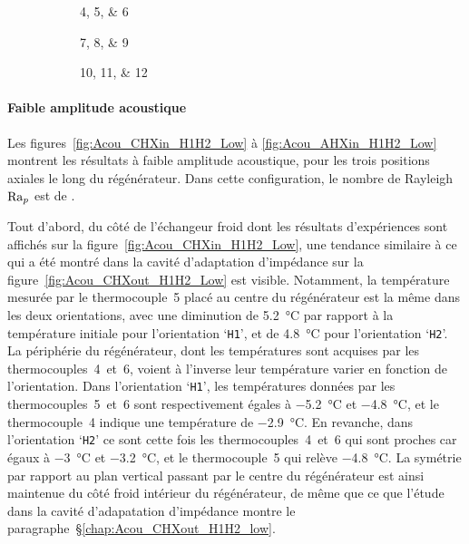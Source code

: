 \begin{figure}[!ht]
    \centering
	\begin{subfigure}{\textwidth}
		\centering
		
		\caption{\numlist{4;5;6}}
		\label{fig:HeatOnly_CHXin_H1H2}
	\end{subfigure}	
	\begin{subfigure}{\textwidth}
		\centering
		
		\caption{\numlist{7;8;9}}
		\label{fig:HeatOnly_Regmid_H1H2}
	\end{subfigure}	
	\begin{subfigure}{\textwidth}
		\centering
		
		\caption{\numlist{10;11;12}}
		\label{fig:HeatOnly_AHXin_H1H2}
	\end{subfigure}		   
    \caption{}
    \label{fig:HeatOnly_H1H2}
\end{figure}


\paragraph*{Faible amplitude acoustique}
Les figures~\ref{fig:Acou_CHXin_H1H2_Low} à \ref{fig:Acou_AHXin_H1H2_Low} montrent les résultats à faible amplitude acoustique, pour les trois positions axiales le long du régénérateur. Dans cette configuration, le nombre de Rayleigh $\mathrm{Ra}_p$ est de . 

Tout d'abord, du côté de l'échangeur froid dont les résultats d'expériences sont affichés sur la figure~\ref{fig:Acou_CHXin_H1H2_Low}, une tendance similaire à ce qui a été montré dans la cavité d'adaptation d'impédance sur la figure~\ref{fig:Acou_CHXout_H1H2_Low} est visible. Notamment, la température mesurée par le thermocouple~5 placé au centre du régénérateur est la même dans les deux orientations, avec une diminution de \qty{5.2}{\degreeCelsius} par rapport à la température initiale pour l'orientation `\texttt{H1}', et de \qty{4.8}{\degreeCelsius} pour l'orientation `\texttt{H2}'. La périphérie du régénérateur, dont les températures sont acquises par les thermocouples~4~et~6, voient à l'inverse leur température varier en fonction de l'orientation. Dans l'orientation `\texttt{H1}', les températures données par les thermocouples~5~et~6 sont respectivement égales à \qty{-5.2}{\degreeCelsius} et \qty{-4.8}{\degreeCelsius}, et le thermocouple~4 indique une température de \qty{-2.9}{\degreeCelsius}. En revanche, dans l'orientation `\texttt{H2}' ce sont cette fois les thermocouples~4~et~6 qui sont proches car égaux à \qty{-3}{\degreeCelsius} et \qty{-3.2}{\degreeCelsius}, et le thermocouple~5 qui relève \qty{-4.8}{\degreeCelsius}. La symétrie par rapport au plan vertical passant par le centre du régénérateur est ainsi maintenue du côté froid intérieur du régénérateur, de même que ce que l'étude dans la cavité d'adapatation d'impédance montre le paragraphe~§\ref{chap:Acou_CHXout_H1H2_low}.

